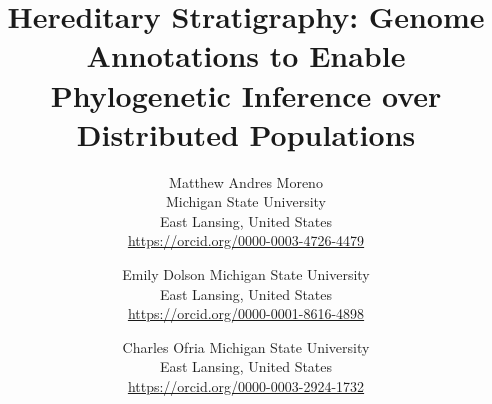 \title{ Hereditary Stratigraphy: Genome Annotations to Enable Phylogenetic Inference over Distributed Populations }

\author{
Matthew Andres Moreno\\
Michigan State University\\
East Lansing, United States \\
\url{https://orcid.org/0000-0003-4726-4479} \\
\and
Emily Dolson
Michigan State University\\
East Lansing, United States \\
\url{https://orcid.org/0000-0001-8616-4898}
\and
Charles Ofria
Michigan State University\\
East Lansing, United States \\
\url{https://orcid.org/0000-0003-2924-1732}
}

\maketitle
